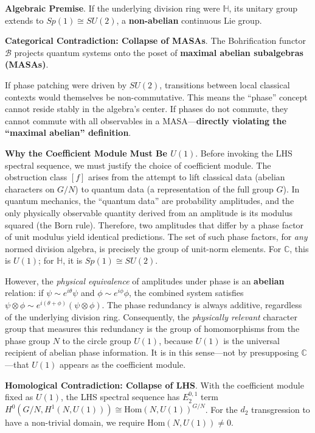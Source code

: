 \documentclass[11pt]{article}
\begin{document}
\textbf{Algebraic Premise}.
If the underlying division ring were $\mathbb{H}$, its unitary group extends to $Sp(1) \cong SU(2)$, a \textbf{non-abelian} continuous Lie group.

\textbf{Categorical Contradiction: Collapse of MASAs}.
The Bohrification functor $\mathcal{B}$ projects quantum systems onto the poset of \textbf{maximal abelian subalgebras (MASAs)}.

If phase patching were driven by $SU(2)$, transitions between local classical contexts would themselves be non-commutative. This means the ``phase'' concept cannot reside stably in the algebra's center. If phases do not commute, they cannot commute with all observables in a MASA---\textbf{directly violating the ``maximal abelian'' definition}.

\textbf{Why the Coefficient Module Must Be $U(1)$}.
Before invoking the LHS spectral sequence, we must justify the choice of coefficient module. The obstruction class $[f]$ arises from the attempt to lift classical data (abelian characters on $G/N$) to quantum data (a representation of the full group $G$). In quantum mechanics, the ``quantum data'' are probability amplitudes, and the only physically observable quantity derived from an amplitude is its modulus squared (the Born rule). Therefore, two amplitudes that differ by a phase factor of unit modulus yield identical predictions. The set of such phase factors, for \emph{any} normed division algebra, is precisely the group of unit-norm elements. For $\mathbb{C}$, this is $U(1)$; for $\mathbb{H}$, it is $Sp(1) \cong SU(2)$.

However, the \emph{physical equivalence} of amplitudes under phase is an \textbf{abelian} relation: if $\psi \sim e^{i\theta}\psi$ and $\phi \sim e^{i\phi}\phi$, the combined system satisfies $\psi \otimes \phi \sim e^{i(\theta+\phi)}(\psi \otimes \phi)$. The phase redundancy is always additive, regardless of the underlying division ring. Consequently, the \emph{physically relevant} character group that measures this redundancy is the group of homomorphisms from the phase group $N$ to the circle group $U(1)$, because $U(1)$ is the universal recipient of abelian phase information. It is in this sense---not by presupposing $\mathbb{C}$---that $U(1)$ appears as the coefficient module.

\textbf{Homological Contradiction: Collapse of LHS}.
With the coefficient module fixed as $U(1)$, the LHS spectral sequence has $E_2^{0,1}$ term $H^0(G/N, H^1(N, U(1))) \cong \mathrm{Hom}(N, U(1))^{G/N}$. For the $d_2$ transgression to have a non-trivial domain, we require $\mathrm{Hom}(N, U(1)) \neq 0$.
\end{document}
